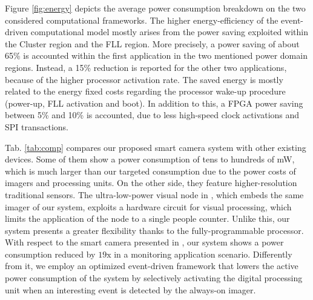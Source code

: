 \documentclass[journal]{IEEEtran}
\begin{document}
Figure \ref{fig:energy} depicts the average power consumption breakdown on the two considered computational frameworks. 
The higher energy-efficiency of the event-driven computational model mostly arises from the power saving exploited within the Cluster region and the FLL region. 
More precisely, a power saving of about 65\% is accounted within the first application in the two mentioned power domain regions. Instead, a 15\% reduction is reported for the other two applications, because of the higher processor activation rate. The saved energy is mostly related to the energy fixed costs regarding the processor wake-up procedure (power-up, FLL activation and boot). 
In addition to this, a FPGA power saving between 5\% and 10\% is accounted, due to less high-speed clock activations and SPI transactions. 



Tab. \ref{tab:comp} compares our proposed smart camera system with other existing devices. 
Some of them \cite{CMUCAM,Casares2011,Hengstler2007,Rahimi2005} show a power consumption of tens to hundreds of mW, which is much larger than our targeted consumption due to the power costs of imagers and processing units. 
On the other side, they feature higher-resolution traditional sensors.
The ultra-low-power visual node in \cite{Gasparini2011}, which embeds the same imager of our system, exploits a hardware circuit for visual processing, which limits the application of the node to a single people counter. Unlike this, our system presents a greater flexibility thanks to the fully-programmable processor. With respect to the smart camera presented in \cite{Carey2013}, our system shows a power consumption reduced by $19\mathrm{x}$ in a monitoring application scenario. Differently from it, we employ an optimized event-driven framework that lowers the active power consumption of the system by selectively activating the digital processing unit when an interesting event is detected by the always-on imager.







%
%
\end{document}
